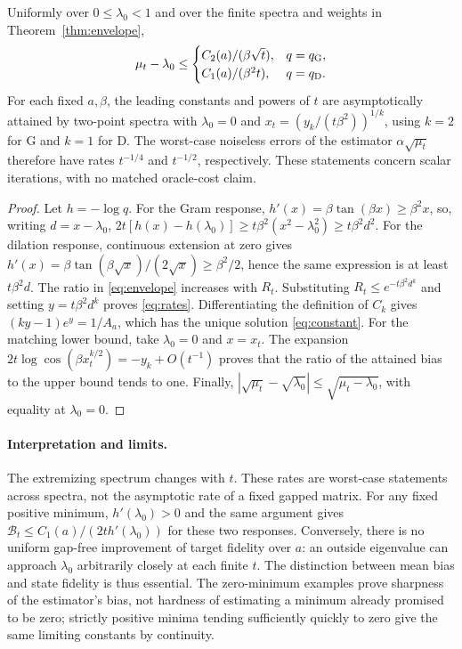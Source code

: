 \begin{theorem}\label{thm:rates}
Uniformly over $0\leq\lambda_0<1$ and over the finite spectra and weights in
Theorem~\ref{thm:envelope},
\begin{equation}\label{eq:rates}
 \mu_t-\lambda_0\leq
 \begin{cases}
 C_2(a)/(\beta\sqrt{t}), &q=q_{\rm G},\\
 C_1(a)/(\beta^2 t), &q=q_{\rm D}.
 \end{cases}
\end{equation}
For each fixed $a,\beta$, the leading constants and powers of $t$ are
asymptotically attained by two-point spectra with $\lambda_0=0$ and
$x_t=(y_k/(t\beta^2))^{1/k}$, using $k=2$ for G and $k=1$ for D.
The worst-case noiseless errors of the estimator $\alpha\sqrt{\mu_t}$
therefore have rates $t^{-1/4}$ and $t^{-1/2}$, respectively.
These statements concern scalar iterations, with no matched oracle-cost claim.
\end{theorem}
\begin{proof}
Let $h=-\log q$. For the Gram response,
$h'(x)=\beta\tan(\beta x)\geq\beta^2 x$, so, writing $d=x-\lambda_0$,
$2t[h(x)-h(\lambda_0)]\geq t\beta^2(x^2-\lambda_0^2)
\geq t\beta^2d^2$.
For the dilation response, continuous extension at zero gives
$h'(x)=\beta\tan(\beta\sqrt{x})/(2\sqrt{x})\geq\beta^2/2$,
hence the same expression is at least $t\beta^2d$.
The ratio in \eqref{eq:envelope} increases with $R_t$. Substituting
$R_t\leq e^{-t\beta^2d^k}$ and setting $y=t\beta^2d^k$ proves
\eqref{eq:rates}. Differentiating the definition of $C_k$ gives
$(ky-1)e^y=1/A_a$, which has the unique solution \eqref{eq:constant}.
For the matching lower bound, take $\lambda_0=0$ and $x=x_t$. The expansion
$2t\log\cos(\beta x_t^{k/2})=-y_k+O(t^{-1})$ proves that the ratio
of the attained bias to the upper bound tends to one. Finally,
$|\sqrt{\mu_t}-\sqrt{\lambda_0}|\leq\sqrt{\mu_t-\lambda_0}$,
with equality at $\lambda_0=0$.
\end{proof}

\paragraph{Interpretation and limits.}
The extremizing spectrum changes with $t$. These rates are worst-case
statements across spectra, not the asymptotic rate of a fixed gapped matrix.
For any fixed positive minimum, $h'(\lambda_0)>0$ and the same argument gives
$\mathcal B_t\leq C_1(a)/(2t h'(\lambda_0))$ for these two responses.
Conversely, there is no uniform gap-free improvement of target fidelity over
$a$: an outside eigenvalue can approach $\lambda_0$ arbitrarily closely at
each finite $t$. The distinction between mean bias and state fidelity is thus
essential. The zero-minimum examples prove sharpness of the estimator's bias,
not hardness of estimating a minimum already promised to be zero; strictly
positive minima tending sufficiently quickly to zero give the same limiting
constants by continuity.

